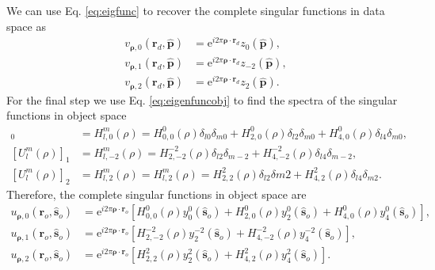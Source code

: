 \documentclass[11pt]{article}
\newcommand{\me}{\mathrm{e}}
\providecommand{\ro}[1]{\mathbf{\mathbf{r}}_o}
\providecommand{\so}[1]{\mathbf{\hat{s}}_o}
\providecommand{\rd}[1]{\mathbf{r}_d}
\providecommand{\mh}[1]{\mathbf{\hat{#1}}}
\providecommand{\bs}[1]{\boldsymbol{#1}}
\begin{document}
We can use Eq. \ref{eq:eigfunc} to recover the complete singular functions in
data space as
\begin{align}
  v_{\bs{\rho},0}(\rd{}, \mh{p}) &= \me{}^{i2\pi\bs{\rho}\cdot\rd{}}z_0(\mh{p}),\\
  v_{\bs{\rho},1}(\rd{}, \mh{p}) &= \me{}^{i2\pi\bs{\rho}\cdot\rd{}}z_{-2}(\mh{p}),\\
  v_{\bs{\rho},2}(\rd{}, \mh{p}) &= \me{}^{i2\pi\bs{\rho}\cdot\rd{}}z_2(\mh{p}).
\end{align}
For the final step we use Eq. \ref{eq:eigenfuncobj} to find the spectra of the
singular functions in object space
\begin{align}
  [U_l^m(\rho)]_0 &= H_{l,0}^m(\rho) = H_{0,0}^0(\rho)\delta_{l0}\delta_{m0} + H_{2,0}^0(\rho)\delta_{l2}\delta_{m0} + H_{4,0}^0(\rho)\delta_{l4}\delta_{m0},\\
  [U_l^m(\rho)]_1 &= H_{l,-2}^m(\rho) = H_{2,-2}^{-2}(\rho)\delta_{l2}\delta_{m-2} + H_{4,-2}^{-2}(\rho)\delta_{l4}\delta_{m-2},\\
  [U_l^m(\rho)]_2 &= H_{l,2}^m(\rho) = H_{l,2}^m(\rho) = H_{2,2}^{2}(\rho)\delta_{l2}\delta{m2} + H_{4,2}^{2}(\rho)\delta_{l4}\delta_{m2}.
\end{align}
Therefore, the complete singular functions in object space are
\begin{align}
  u_{\bs{\rho},0}(\ro{}, \so{}) &= \me{}^{i2\pi\bs{\rho}\cdot\ro{}}[H_{0,0}^0(\rho)y_0^0(\so{}) + H_{2,0}^0(\rho)y_2^0(\so{}) + H_{4,0}^0(\rho)y_4^0(\so{})],\\
  u_{\bs{\rho},1}(\ro{}, \so{}) &= \me{}^{i2\pi\bs{\rho}\cdot\ro{} }[H_{2,-2}^{-2}(\rho)y_2^{-2}(\so{}) + H_{4,-2}^{-2}(\rho)y_4^{-2}(\so{})],\\
  u_{\bs{\rho},2}(\ro{}, \so{}) &= \me{}^{i2\pi\bs{\rho}\cdot\ro{} }[H_{2,2}^2(\rho)y_2^2(\so{}) + H_{4,2}^2(\rho)y_4^2(\so{})].
\end{align}
\end{document}
